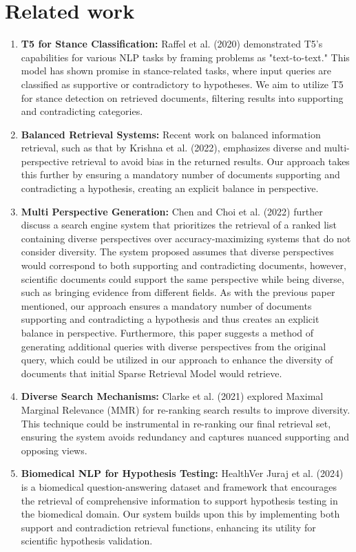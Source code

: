 \documentclass[sigconf]{acmart}
\begin{document}
\section{Related work}
\begin{enumerate}[left=0em] 
    \item \textbf{T5 for Stance Classification:} Raffel et al. (2020) demonstrated T5's capabilities for various NLP tasks by framing problems as "text-to-text." This model has shown promise in stance-related tasks, where input queries are classified as supportive or contradictory to hypotheses. We aim to utilize T5 for stance detection on retrieved documents, filtering results into supporting and contradicting categories.
    \item \textbf{Balanced Retrieval Systems:} Recent work on balanced information retrieval, such as that by Krishna et al. (2022), emphasizes diverse and multi-perspective retrieval to avoid bias in the returned results. Our approach takes this further by ensuring a mandatory number of documents supporting and contradicting a hypothesis, creating an explicit balance in perspective.
    \item \textbf{Multi Perspective Generation:} Chen and Choi et al. (2022) further discuss a search engine system that prioritizes the retrieval of a ranked list containing diverse perspectives over accuracy-maximizing systems that do not consider diversity. The system proposed assumes that diverse perspectives would correspond to both supporting and contradicting documents, however, scientific documents could support the same perspective while being diverse, such as bringing evidence from different fields. As with the previous paper mentioned, our approach ensures a mandatory number of documents supporting and contradicting a hypothesis and thus creates an explicit balance in perspective. Furthermore, this paper suggests a method of generating additional queries with diverse perspectives from the original query, which could be utilized in our approach to enhance the diversity of documents that initial Sparse Retrieval Model would retrieve.
    \item \textbf{Diverse Search Mechanisms:} Clarke et al. (2021) explored Maximal Marginal Relevance (MMR) for re-ranking search results to improve diversity. This technique could be instrumental in re-ranking our final retrieval set, ensuring the system avoids redundancy and captures nuanced supporting and opposing views.
    \item \textbf{Biomedical NLP for Hypothesis Testing:} HealthVer Juraj et al. (2024) is a biomedical question-answering dataset and framework that encourages the retrieval of comprehensive information to support hypothesis testing in the biomedical domain. Our system builds upon this by implementing both support and contradiction retrieval functions, enhancing its utility for scientific hypothesis validation.

\end{enumerate}
\end{document}
